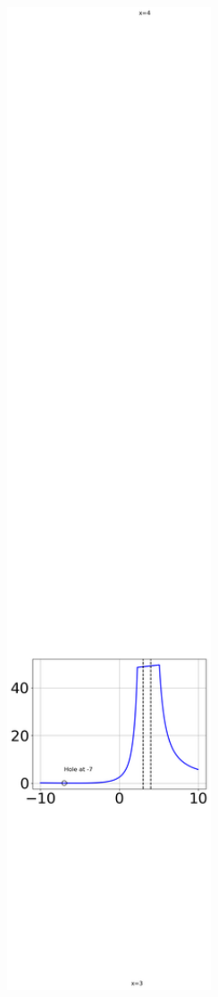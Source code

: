 \documentclass[14pt]{extbook}
\begin{document}
\begin{enumerate}
{\begin{center}
    \includegraphics[width=0.5\textwidth]{../Figures/identifyGraphOfRationalFunctionCopyB.png}

\end{center}}
\end{enumerate}
\end{document}
